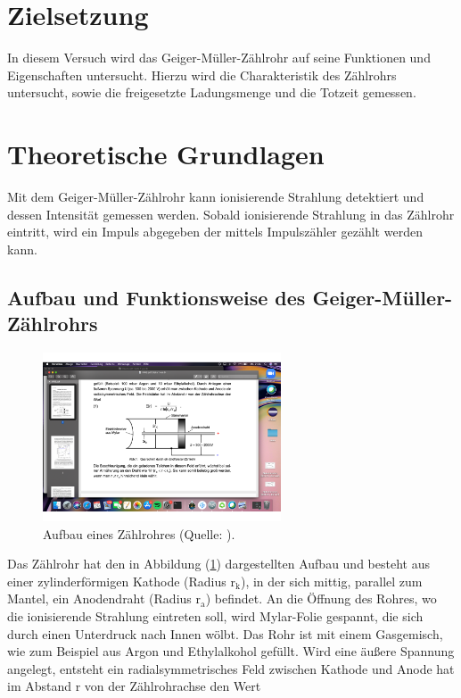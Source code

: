 \section{Zielsetzung}
In diesem Versuch wird das Geiger-Müller-Zählrohr auf seine Funktionen und Eigenschaften untersucht.
Hierzu wird die Charakteristik des Zählrohrs untersucht, sowie die freigesetzte Ladungsmenge und die Totzeit gemessen.


\section{Theoretische Grundlagen}
Mit dem Geiger-Müller-Zählrohr kann ionisierende Strahlung detektiert und dessen Intensität gemessen werden.
Sobald ionisierende Strahlung in das Zählrohr eintritt, wird ein Impuls abgegeben der mittels Impulszähler gezählt werden kann.

\subsection{Aufbau und Funktionsweise des Geiger-Müller-Zählrohrs}

\begin{figure}
            \centering
               \includegraphics[height=5cm]{rohr.pdf}
               \caption{Aufbau eines Zählrohres (Quelle: \cite{V703}).}
               \label{fig:rohr}
        \end{figure}

\noindent
Das Zählrohr hat den in Abbildung (\ref{fig:rohr}) dargestellten Aufbau und besteht aus einer zylinderförmigen Kathode (Radius $\text{r}_\text{k}$), 
in der sich mittig, parallel zum Mantel, ein Anodendraht (Radius $\text{r}_\text{a}$) befindet.
An die Öffnung des Rohres, wo die ionisierende Strahlung eintreten soll, wird Mylar-Folie gespannt, die sich durch einen Unterdruck nach Innen wölbt.
Das Rohr ist mit einem Gasgemisch, wie zum Beispiel aus Argon und Ethylalkohol gefüllt.
Wird eine äußere Spannung angelegt, entsteht ein radialsymmetrisches Feld zwischen Kathode und Anode hat im Abstand r von der Zählrohrachse den Wert

